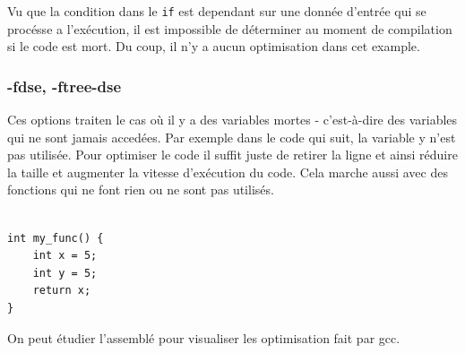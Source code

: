 \documentclass[11pt]{article} %
\begin{document}
Vu que la condition dans le \verb|if| est dependant sur une donn\'ee d'entr\'ee qui se proc\'esse a l'ex\'ecution, il est impossible de d\'eterminer
au moment de compilation si le code est mort. Du coup, il n'y a aucun optimisation dans cet example.







\subsubsection{-fdse, -ftree-dse}

Ces options traiten le cas o\`u il y a des variables mortes - c'est-\`a-dire des variables qui ne sont jamais acced\'ees.
Par exemple dans le code qui suit, la variable y n’est pas utilisée. Pour optimiser le code il suffit juste de retirer la ligne et ainsi
réduire la taille et augmenter la vitesse d’exécution du code. Cela marche aussi avec des fonctions qui ne font rien ou ne sont pas utilisés.

\begin{verbatim}

int my_func() {
    int x = 5;
    int y = 5;
    return x;
}
\end{verbatim}

\newpage

On peut \'etudier l'assembl\'e pour visualiser les optimisation fait par gcc.
\end{document}

